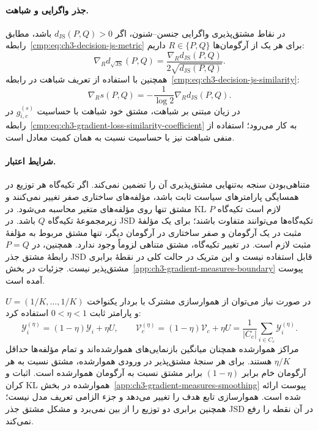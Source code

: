 \paragraph{جذر واگرایی و شباهت.}
در نقاط مشتق‌پذیری واگرایی جنسن--شنون، اگر
$d_{\mathrm{JS}}(P,Q)>0$ باشد، مطابق
رابطه~\eqref{cmp:eq:ch3-decision-js-metric}
برای هر یک از آرگومان‌ها $R\in\{P,Q\}$ داریم:
\begin{equation}\label{cmp:eq:ch3-gradient-sqrt-js-partials}
\nabla_R d_{\sqrt{\mathrm{JS}}}(P,Q)
=\frac{\nabla_R d_{\mathrm{JS}}(P,Q)}
{2\sqrt{d_{\mathrm{JS}}(P,Q)}}.
\end{equation}
همچنین با استفاده از تعریف شباهت در
رابطه~\eqref{cmp:eq:ch3-decision-js-similarity}:
\begin{equation}\label{cmp:eq:ch3-gradient-js-similarity-partials}
\nabla_R s(P,Q)=-\frac{1}{\log2}\nabla_R d_{\mathrm{JS}}(P,Q).
\end{equation}
در زیان مبتنی بر شباهت، مشتق خود شباهت
با حساسیت $g_{i,c}^{(s)}$ در
رابطه~\eqref{cmp:eq:ch3-gradient-loss-similarity-coefficient}
به کار می‌رود؛ استفاده از منفی شباهت نیز
با حساسیت نسبت به همان کمیت معادل است.

\paragraph{شرایط اعتبار.}
متناهی‌بودن سنجه به‌تنهایی مشتق‌پذیری آن را
تضمین نمی‌کند. اگر تکیه‌گاه هر توزیع در
همسایگی پارامترهای سیاست ثابت باشد، مؤلفه‌های
ساختاری صفر تغییر نمی‌کنند و مشتق تنها روی
مؤلفه‌های متغیر محاسبه می‌شود. در KL لازم است
تکیه‌گاه $P$ زیرمجموعهٔ تکیه‌گاه $Q$ باشد.
در JSD تکیه‌گاه‌ها می‌توانند متفاوت باشند؛
برای یک مؤلفهٔ مثبت در یک آرگومان و صفر ساختاری
در آرگومان دیگر، تنها مشتق مربوط به مؤلفهٔ
مثبت لازم است. در تغییر تکیه‌گاه، مشتق متناهی
لزوماً وجود ندارد. همچنین، در $P=Q$ رابطهٔ
مشتق جذر JSD قابل استفاده نیست و این متریک
در حالت کلی در نقطهٔ برابری مشتق‌پذیر نیست.
جزئیات در بخش~\ref{app:ch3-gradient-measures-boundary}
پیوست آمده است.

در صورت نیاز می‌توان از هموارسازی مشترک با
بردار یکنواخت $U=(1/K,\ldots,1/K)$ و پارامتر
ثابت $0<\eta<1$ استفاده کرد:
\begin{equation}\label{cmp:eq:ch3-stable-smoothed-representations}
\boxed{
\mathscr Y_i^{(\eta)}=(1-\eta)\mathscr Y_i+\eta U,
\qquad
\mathcal V_c^{(\eta)}=(1-\eta)\mathcal V_c+\eta U
=\frac1{|C_c|}\sum_{i\in C_c}\mathscr Y_i^{(\eta)}.
}
\end{equation}
مراکز هموارشده همچنان میانگین بازنمایی‌های
هموارشده‌اند و تمام مؤلفه‌ها حداقل $\eta/K$
هستند. برای هر سنجهٔ مشتق‌پذیر در ورودی
هموارشده، مشتق نسبت به هر آرگومان خام برابر
$(1-\eta)$ برابر مشتق نسبت به آرگومان
هموارشده است. اثبات و کران KL هموارشده در
بخش~\ref{app:ch3-gradient-measures-smoothing}
پیوست ارائه شده است. هموارسازی تابع هدف
را تغییر می‌دهد و جزء الزامی تعریف مدل نیست؛
همچنین برابری دو توزیع را از بین نمی‌برد
و مشکل مشتق جذر JSD در آن نقطه را رفع نمی‌کند.

